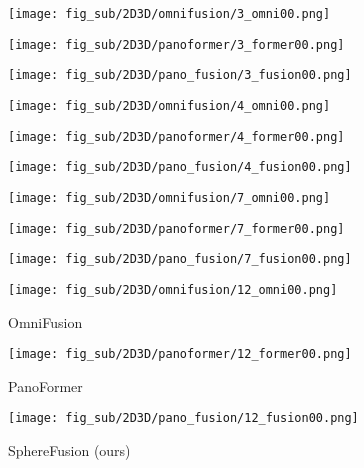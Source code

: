 \begin{figure*}[t]
	\centering
	\captionsetup[subfigure]{labelformat=empty}
	
	
	\begin{subfigure}{0.3\linewidth}
		\texttt{[image: fig\_sub/2D3D/omnifusion/3\_omni00.png]}
	\end{subfigure}
	\begin{subfigure}{0.3\linewidth}
		\texttt{[image: fig\_sub/2D3D/panoformer/3\_former00.png]}
	\end{subfigure}
	\begin{subfigure}{0.3\linewidth}
		\texttt{[image: fig\_sub/2D3D/pano\_fusion/3\_fusion00.png]}
	\end{subfigure}
	
	\vspace{1pt}
	
	
	\begin{subfigure}{0.3\linewidth}
		\texttt{[image: fig\_sub/2D3D/omnifusion/4\_omni00.png]}
	\end{subfigure}
	\begin{subfigure}{0.3\linewidth}
		\texttt{[image: fig\_sub/2D3D/panoformer/4\_former00.png]}
	\end{subfigure}
	\begin{subfigure}{0.3\linewidth}
		\texttt{[image: fig\_sub/2D3D/pano\_fusion/4\_fusion00.png]}
	\end{subfigure}
	
	\vspace{1pt}
	
	\begin{subfigure}{0.3\linewidth}
		\texttt{[image: fig\_sub/2D3D/omnifusion/7\_omni00.png]}
	\end{subfigure}
	\begin{subfigure}{0.3\linewidth}
		\texttt{[image: fig\_sub/2D3D/panoformer/7\_former00.png]}
	\end{subfigure}
	\begin{subfigure}{0.3\linewidth}
		\texttt{[image: fig\_sub/2D3D/pano\_fusion/7\_fusion00.png]}
	\end{subfigure}
	
	
	\vspace{1pt}
	
	\begin{subfigure}{0.3\linewidth}
		\texttt{[image: fig\_sub/2D3D/omnifusion/12\_omni00.png]}
		\caption{OmniFusion \cite{li2022omnifusion}}
	\end{subfigure}
	\begin{subfigure}{0.3\linewidth}
		\texttt{[image: fig\_sub/2D3D/panoformer/12\_former00.png]}
		\caption{PanoFormer \cite{shen2022panoformer}}
	\end{subfigure}
	\begin{subfigure}{0.3\linewidth}
		\texttt{[image: fig\_sub/2D3D/pano\_fusion/12\_fusion00.png]}
		\caption{SphereFusion (ours)}
	\end{subfigure}	
	

\end{figure*}
